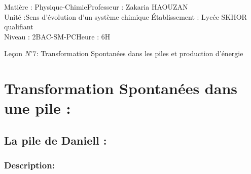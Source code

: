 \documentclass[12pt]{article}
\author{Zakaria HAOUZAN}
\date{\today}
\newcommand\headerMe[2]{\noindent{}#1\hfill#2}
\begin{document}
\headerMe{Matière : Physique-Chimie}{Professeur : Zakaria HAOUZAN}\\
\headerMe{Unité :Sens d'évolution d'un système chimique  }{Établissement : Lycée SKHOR qualifiant}\\
\headerMe{Niveau : 2BAC-SM-PC}{Heure : 6H}\\



\begin{center}

    \Large{Leçon $N^{\circ} 7 $: \color{red}Transformation Spontanées dans les piles et production d'énergie }
\end{center}
\section{Transformation Spontanées dans une pile :}

\subsection{La pile de Daniell : }
\subsubsection{Description:}
\end{document}
